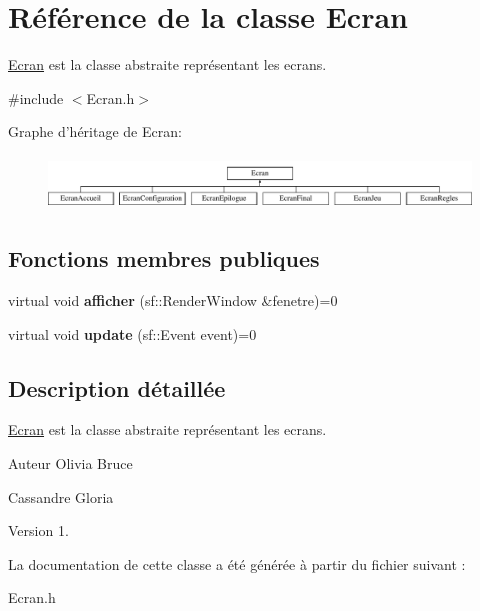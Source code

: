 \hypertarget{classEcran}{\section{\-Référence de la classe \-Ecran}
\label{classEcran}
}


\hyperlink{classEcran}{\-Ecran} est la classe abstraite représentant les ecrans.  




{\ttfamily \#include $<$\-Ecran.\-h$>$}

\-Graphe d'héritage de \-Ecran\-:\begin{figure}[H]
\begin{center}
\leavevmode
\includegraphics[height=1.435897cm]{classEcran}
\end{center}
\end{figure}
\subsection*{\-Fonctions membres publiques}
\begin{DoxyCompactItemize}
\item 
\hypertarget{classEcran_a2b1ad69e95ff2b6fb1a411b3645922e0}{virtual void {\bfseries afficher} (sf\-::\-Render\-Window \&fenetre)=0}\label{classEcran_a2b1ad69e95ff2b6fb1a411b3645922e0}

\item 
\hypertarget{classEcran_a03b54d987a5f17eab6463a3b84ef0ba4}{virtual void {\bfseries update} (sf\-::\-Event event)=0}\label{classEcran_a03b54d987a5f17eab6463a3b84ef0ba4}

\end{DoxyCompactItemize}


\subsection{\-Description détaillée}
\hyperlink{classEcran}{\-Ecran} est la classe abstraite représentant les ecrans. 

\begin{DoxyAuthor}{\-Auteur}
\-Olivia \-Bruce 

\-Cassandre \-Gloria 
\end{DoxyAuthor}
\begin{DoxyVersion}{\-Version}
1. 
\end{DoxyVersion}


\-La documentation de cette classe a été générée à partir du fichier suivant \-:\begin{DoxyCompactItemize}
\item 
\-Ecran.\-h\end{DoxyCompactItemize}
